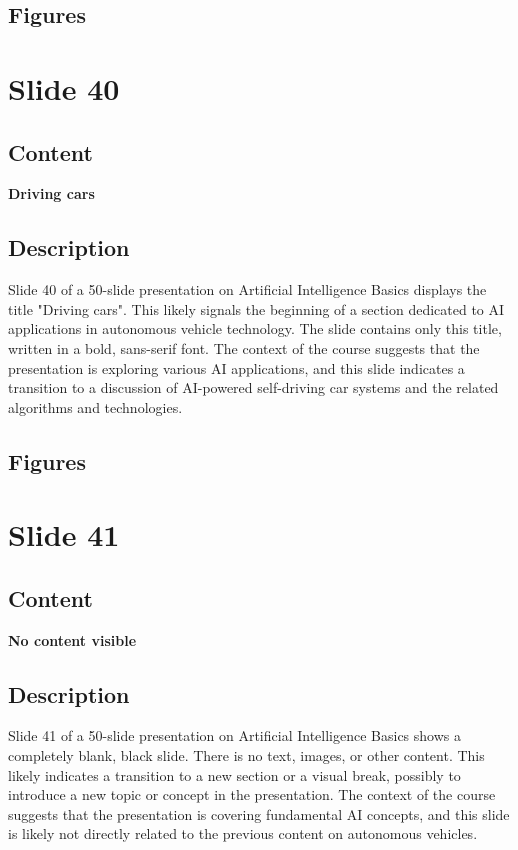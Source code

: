 \documentclass{article}%
\begin{document}
\subsection{Figures}%
\begin{figure}[H]%
\centering%
\end{figure}

%
\newpage%
\section{Slide 40}%
\label{sec:Slide40}%
\subsection{Content}%

\textbf{Driving cars}
%
\subsection{Description}%
Slide 40 of a 50-slide presentation on Artificial Intelligence Basics displays the title "Driving cars".  This likely signals the beginning of a section dedicated to AI applications in autonomous vehicle technology.  The slide contains only this title, written in a bold, sans-serif font.  The context of the course suggests that the presentation is exploring various AI applications, and this slide indicates a transition to a discussion of AI-powered self-driving car systems and the related algorithms and technologies.%
\subsection{Figures}%
\begin{figure}[H]%
\centering%
\end{figure}

%
\newpage%
\section{Slide 41}%
\label{sec:Slide41}%
\subsection{Content}%

\textbf{No content visible}
%
\subsection{Description}%

Slide 41 of a 50-slide presentation on Artificial Intelligence Basics shows a completely blank, black slide.  There is no text, images, or other content.  This likely indicates a transition to a new section or a visual break, possibly to introduce a new topic or concept in the presentation.  The context of the course suggests that the presentation is covering fundamental AI concepts, and this slide is likely not directly related to the previous content on autonomous vehicles.
%
\end{document}
